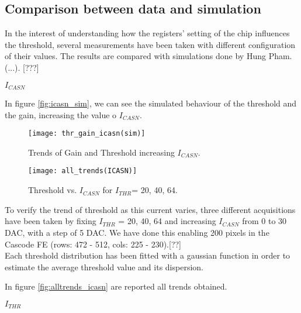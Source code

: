 
\subsection{Comparison between data and simulation}

In the interest of understanding how the registers' setting of the chip influences the threshold, several measurements have been taken with different configuration of their values.
The results are compared with simulations done by Hung Pham.  (...). [???]

\begin{description}
\item[\textbf{$I_{CASN}$}] 
\end{description}

In figure \vref{fig:icasn_sim}, we can see the simulated behaviour of the threshold and the gain, increasing the value o $I_{CASN}$.

\begin{figure}[h!]
\centering
\texttt{[image: thr\_gain\_icasn(sim)]}
\caption{Trends of Gain and Threshold increasing $I_{CASN}$.}
\label{fig:icasn_sim}
\end{figure}

\begin{figure}[h!]
\centering
\texttt{[image: all\_trends(ICASN)]}
\caption{Threshold vs. $I_{CASN}$ for $I_{THR}$= 20, 40, 64.}
\label{fig:alltrends_icasn}
\end{figure}

To verify the trend of threshold as this current varies, three different acquisitions have been taken by fixing $I_{THR}$ = 20, 40, 64 and increasing $I_{CASN}$ from 0  to 30 DAC, with a step of 5 DAC. We have done this enabling 200 pixels in the Cascode FE (rows: 472 - 512, cols: 225 - 230).[??]\\

Each threshold distribution has been fitted with a gaussian function in order to estimate the average threshold value and its dispersion.

In figure \vref{fig:alltrends_icasn} are reported all trends obtained.


\begin{description}
\item[\textbf{$I_{THR}$}]
\end{description}

